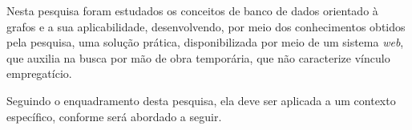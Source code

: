 \par Nesta pesquisa foram estudados os conceitos de banco de dados orientado à grafos e a sua aplicabilidade, desenvolvendo, por meio dos conhecimentos obtidos pela pesquisa, uma solução prática, disponibilizada por meio de um sistema \textit{web}, que auxilia na busca por mão de obra temporária, que não caracterize vínculo empregatício.

\par Seguindo o enquadramento desta pesquisa, ela deve ser aplicada a um contexto específico, conforme será abordado a seguir. 




